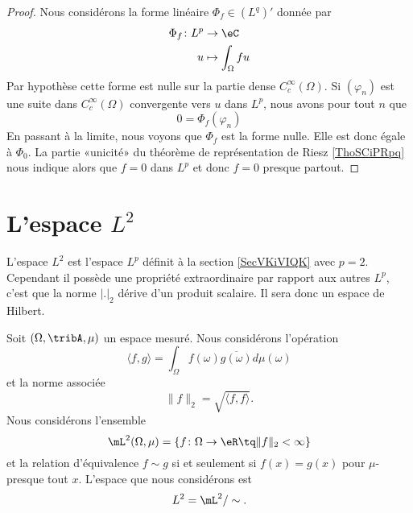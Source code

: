 \begin{proof}
    Nous considérons la forme linéaire \( \Phi_f\in (L^q)'\) donnée par
    \begin{equation}
        \begin{aligned}
            \Phi_f\colon L^p&\to \eC \\
            u&\mapsto \int_{\Omega}fu
        \end{aligned}
    \end{equation}
    Par hypothèse cette forme est nulle sur la partie dense \(  C^{\infty}_c(\Omega)\). Si \( (\varphi_n)\) est une suite dans \(  C^{\infty}_c(\Omega)\) convergente vers \( u\) dans \( L^p\), nous avons pour tout \( n\) que
    \begin{equation}
        0=\Phi_f(\varphi_n)
    \end{equation}
    En passant à la limite, nous voyons que \( \Phi_f\) est la forme nulle. Elle est donc égale à \( \Phi_0\). La partie «unicité» du théorème de représentation de Riesz \ref{ThoSCiPRpq} nous indique alors que \( f=0\) dans \( L^p\) et donc \( f=0\) presque partout.
\end{proof}

\section{L'espace \texorpdfstring{$L^2$}{$L^2$}}
\label{SecCKZSrZK}

L'espace \( L^2\) est l'espace \( L^p\) définit à la section \ref{SecVKiVIQK} avec \( p=2\). Cependant il possède une propriété extraordinaire par rapport aux autres \( L^p\), c'est que la norme \( | . |_2\) dérive d'un produit scalaire. Il sera donc un espace de Hilbert.

Soit \( (\Omega,\tribA,\mu)\) un espace mesuré. Nous considérons l'opération
\begin{equation}    \label{DefProdScalLubrgTj}
    \langle f, g\rangle =\int_{\Omega}f(\omega)\overline{ g(\omega)}d\mu(\omega)
\end{equation}
et la norme associée
\begin{equation}
    \| f \|_2=\sqrt{\langle f, f\rangle }.
\end{equation}
Nous considérons l'ensemble
\begin{equation}
    \mL^2(\Omega,\mu)=\{ f\colon \Omega\to \eR\tq \| f \|_2<\infty \}
\end{equation}
et la relation d'équivalence \( f\sim g\) si et seulement si \( f(x)=g(x)\) pour \( \mu\)-presque tout \( x\). L'espace que nous considérons est
\begin{equation}
    L^2=\mL^2/\sim.
\end{equation}

